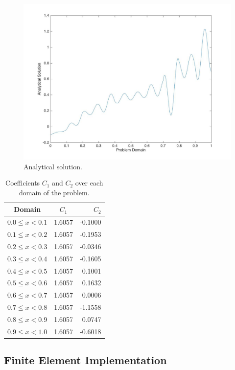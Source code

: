 \documentclass[10pt]{article}
\begin{document}
\begin{figure}[H]
\begin{center}  \includegraphics[width=0.75\linewidth]{AnalyticalSoln2.jpg}
\caption{Analytical solution.}
\end{center}
\end{figure}

\begin{table}[H]
\caption{Coefficients \(C_1\) and \(C_2\) over each domain of the problem.}
\centering
\begin{tabular}{c c r}
\hline\hline
Domain & \(C_1\) & \(C_2\)\\ [0.5ex]
\hline
\(0.0\leq x< 0.1\) & 1.6057  & -0.1000\\
\(0.1\leq x< 0.2\) & 1.6057  & -0.1953\\
\(0.2\leq x< 0.3\) & 1.6057  & -0.0346 \\
\(0.3\leq x< 0.4\) & 1.6057  & -0.1605\\
\(0.4\leq x< 0.5\) & 1.6057  &  0.1001\\
\(0.5\leq x< 0.6\) & 1.6057  &  0.1632\\
\(0.6\leq x< 0.7\) & 1.6057  &  0.0006\\
\(0.7\leq x< 0.8\) & 1.6057  &  -1.1558\\
\(0.8\leq x< 0.9\) & 1.6057  &  0.0747\\
\(0.9\leq x< 1.0\) & 1.6057  &  -0.6018\\
\hline
\end{tabular}
\label{table:orders}
\end{table}



\subsection{Finite Element Implementation}
\end{document}
